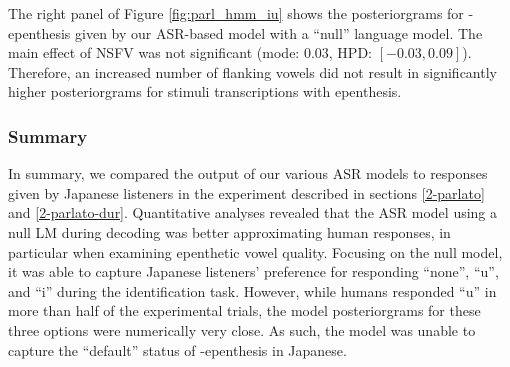 {%


The right panel of Figure \ref{fig:parl_hmm_iu} shows the posteriorgrams for -epenthesis given by our ASR-based model with a ``null'' language model.
The main effect of \textsc{NSFV} was not significant (mode: $0.03$, HPD: $[-0.03, 0.09]$). Therefore, an increased number of  flanking vowels did not result in significantly higher posteriorgrams for stimuli transcriptions with  epenthesis.
\subsubsection{Summary}
In summary, we compared the output of our various ASR models to responses given by Japanese listeners in the experiment described in sections \ref{2-parlato} and \ref{2-parlato-dur}. Quantitative analyses revealed that the ASR model using a null LM during decoding was better approximating human responses, in particular when examining epenthetic vowel quality. Focusing on the null model, it was able to capture Japanese listeners' preference for responding ``none'', ``u'', and ``i'' during the identification task. However, while humans responded ``u'' in more than half of the experimental trials, the model posteriorgrams for these three options were numerically very close. As such, the model was unable to capture the ``default'' status of -epenthesis in Japanese.

}
